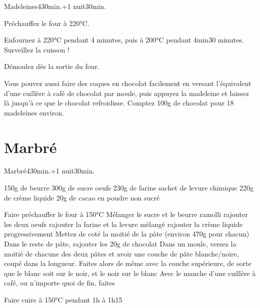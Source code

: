 {\begin{recette}{Madeleines}{4}{30min.+1 nuit}{30min.}
\begin{cuisson}
Préchauffez le four à 220°C. 

Enfournez à 220°C pendant 4 minutes, puis à 200°C pendant 4min30 minutes. Surveillez la cuisson !

Démoulez dès la sortie du four.

\begin{remarque}
Vous pouvez aussi faire des coques en chocolat facilement en versant l'équivalent d'une cuillère à café de chocolat par moule, puis appuyez la madeleine et laissez là jusqu'à ce que le chocolat refroidisse. Comptez 100g de chocolat pour 18 madeleines environ.
\end{remarque}

\end{cuisson}
\end{recette}


\section{Marbré}
\begin{recette}{Marbré}{4}{30min.+1 nuit}{30min.}
\begin{ingredients}
\ingredient 150g de beurre
\ingredient 300g de sucre
 oeufs
\ingredient 230g de farine
 sachet de levure chimique
\ingredient 220g de crème liquide
\ingredient 20g de cacao en poudre non sucré
\end{ingredients}

\begin{preparation}
\etape Faire préchauffer le four à 150°C
\etape Mélanger le sucre et le beurre ramolli
\etape rajouter les deux oeufs
\etape rajouter la farine et la levure mélangé
\etape rajouter la crème liquide progressivement
\etape Mettez de coté la moitié de la pâte (environ 470g pour chacun)
\etape Dans le reste de pâte, rajouter les 20g de chocolat
\etape Dans un moule, versez la moitié de chacune des deux pâtes et avoir une couche de pâte blanche/noire, coupé dans la longueur.
\etape Faites alors de même avec la couche supérieure, de sorte que le blanc soit sur le noir, et le noir sur le blanc
\etape Avec le manche d'une cuillère à café, ou n'importe quoi de fin, faites 
\end{preparation}

\begin{cuisson}
Faire cuire à 150°C pendant 1h à 1h15

\end{cuisson}
\end{recette}

}
